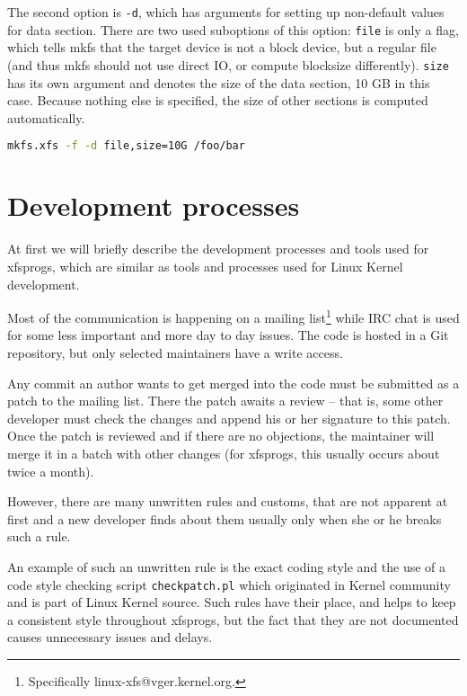 The second option is {\tt -d}, which has arguments for setting up
non-default values for data section.  There are two used suboptions of this
option: {\tt file} is only a flag, which tells mkfs that the target device
is not a block device, but a regular file (and thus mkfs should not use
direct IO, or compute blocksize differently). {\tt size} has its own
argument and denotes the size of the data section, 10 GB in this case.
Because nothing else is specified, the size of other sections is computed
automatically.

\begin{lstlisting}[frame=none, basicstyle=\footnotesize\ttfamily,
language=Bash, numbers=none, numberstyle=\tiny\color{black},caption=
{An example of mkfs.xfs invocation.},
label={lst:refactoring:example}]
mkfs.xfs -f -d file,size=10G /foo/bar
\end{lstlisting}

\section{Development processes}\label{chap:refactoring:processes}

At first we will briefly describe the development processes and tools used for
xfsprogs, which are similar as tools and processes used for Linux Kernel
development.

Most of the communication is happening on a mailing
list\footnote{Specifically linux-xfs@vger.kernel.org.} while IRC chat is
used for some less
important and more day to day issues. The code is hosted in a Git repository,
but only selected maintainers have a write access.

Any commit an author wants to get merged into the code must be submitted as
a patch to the mailing list. There the patch awaits a review -- that is,
some other developer must check the changes and append his or her signature
to this patch. Once the patch is reviewed and if there are no objections,
the maintainer will merge it in a batch with other changes (for xfsprogs,
this usually occurs about twice a month).

However, there are many unwritten rules and customs, that are not apparent
at first and a new developer finds about them usually only when she or he
breaks such a rule.

An example of such an unwritten rule is the exact coding style and the use of
a code style checking script {\tt checkpatch.pl} which originated in Kernel
community and is part of Linux Kernel source. Such rules have their
place, and helps to keep a consistent style throughout xfsprogs, but the
fact that they are not documented causes unnecessary issues and delays.

